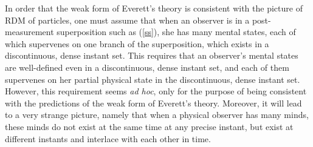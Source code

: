 In order that the weak form of Everett's theory is consistent with the picture of RDM of particles, one must assume that when an observer is in a post-measurement superposition such as  (\ref{ss}), she has many mental states, each of which  supervenes on one branch of the superposition, which exists in a discontinuous, dense instant set.
This requires that an observer's mental states are well-defined even in a discontinuous, dense instant set, and each of them  supervenes on her partial physical state in the discontinuous, dense instant set.
However, this requirement seems \emph{ad hoc}, only for the purpose of being consistent with the predictions of the weak form of Everett's theory. Moreover, it will lead to a very strange picture, namely that when a physical observer has many minds, these minds do not exist at the same time at any precise instant, but exist at different instants and interlace with each other in time.



